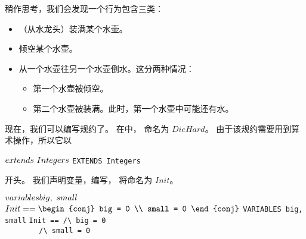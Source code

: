 \begin{ch}
  稍作思考，我们会发现一个行为包含三类\tlastep{}：
  \begin{itemize}
  \item （从水龙头）装满某个水壶。
  \item 倾空某个水壶。
  \item 从一个水壶往另一个水壶倒水。这分两种情况：
  \begin{itemize}
  \item 第一个水壶被倾空。
  \item 第二个水壶被装满。此时，第一个水壶中可能还有水。
  \end{itemize}
  \end{itemize}
  现在，我们可以编写规约了。
  在\tlatoolbox{}中，
  命名为 $DieHard$。
  由于该规约需要用到算术操作，所以它以
  \begin{display}
  \begin{twocols}%
  $\EXTENDS\ Integers$
  \midcol
  \verb|EXTENDS Integers|
  \end{twocols}
  \end{display}
  开头。
  我们声明变量，编写\tlainitpredicate{}，
  将\tlainitpredicate{}命名为 $Init$。
  \smallskip
  \begin{display}
  \begin{twocols}%
  $\VARIABLES big,\ small$ 
  $Init == 
  \begin{conj}
  big = 0 \\ small = 0
  \end{conj}
  $
  \midcol
  \verb*|VARIABLES big, small|
  \verb*|Init == /\ big = 0| \\
  \verb*|        /\ small = 0|
  \end{twocols}
  \end{display}
  \smallskip
\end{ch}
